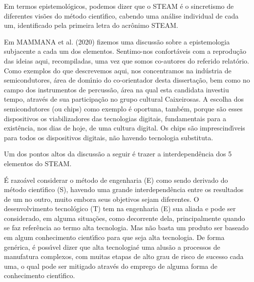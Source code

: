 \documentclass[
12pt,		%
openright,	%
twoside,  %
a4paper,			%
chapter=TITLE,		%
english,			%
french,				%
spanish,			%
brazil				%
]{USPSC-classe/USPSC}
\begin{document}
Em termos epistemol\'ogicos, podemos dizer que o STEAM \'e o sincretismo de diferentes vis\~oes do m\'etodo cient\'{\i}fico, cabendo uma an\'alise individual de cada um, identificado pela primeira letra do acr\^onimo STEAM.









Em  MAMMANA et al. (2020) fizemos uma discuss\~ao sobre a epistemologia subjacente a cada um dos elementos. Sentimo-nos confort\'aveis com a reprodu\c{c}\~ao das ideias aqui, recompiladas, uma vez que somos co-autores do referido relat\'orio. Como exemplos do que descrevemos aqui, nos concentramos na ind\'ustria de semicondutores, \'area de dom\'{\i}nio do co-orientador desta disserta\c{c}\~ao, bem como no campo dos instrumentos de percuss\~ao, \'area na qual esta candidata investiu tempo, atrav\'es de sua participa\c{c}\~ao no grupo cultural \textquotedbl Caixeirosas\textquotedbl . A escolha dos semicondutores (ou chips) como exemplo \'e oportuna, tamb\'em, porque s\~ao esses dispositivos os viabilizadores das tecnologias digitais, fundamentais para a exist\^encia, nos dias de hoje, de uma \textquotedbl cultura digital\textquotedbl . Os chips s\~ao imprescind\'{\i}veis para todos os dispositivos digitais, n\~ao havendo tecnologia substituta.









Um dos pontos altos da discuss\~ao a seguir \'e trazer a interdepend\^encia dos 5 elementos do STEAM.









\'E razo\'avel considerar o m\'etodo de engenharia (E) como sendo derivado do m\'etodo cient\'{\i}fico (S), havendo uma grande interdepend\^encia entre os resultados de um no outro, muito embora seus objetivos sejam diferentes. O desenvolvimento tecnol\'ogico (T) tem na engenharia (E) sua aliada e pode ser considerado, em alguma situa\c{c}\~oes, como decorrente dela, principalmente quando se faz refer\^encia ao termo \textquotedbl alta tecnologia\textquotedbl . Mas n\~ao basta um produto ser baseado em algum conhecimento cient\'{\i}fico para que seja alta tecnologia. De forma gen\'erica, \'e poss\'{\i}vel dizer que \textquotedbl alta tecnologia\textquotedbl  \'e uma alus\~ao a processos de manufatura complexos, com muitas etapas de alto grau de risco de sucesso cada uma, o qual pode ser mitigado atrav\'es do emprego de alguma forma de conhecimento cient\'{\i}fico.
\end{document}
